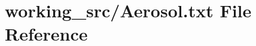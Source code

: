 \hypertarget{_aerosol_8txt}{}\section{working\+\_\+src/\+Aerosol.txt File Reference}
\label{_aerosol_8txt}

